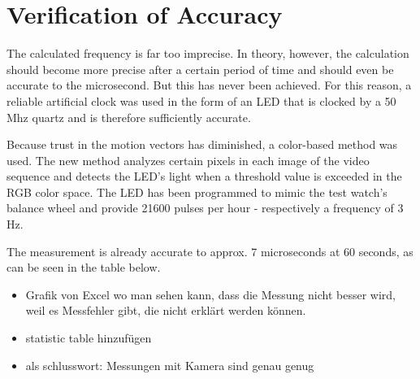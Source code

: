\documentclass[12pt, a4paper]{report}
\begin{document}
    \section{Verification of Accuracy}
    The calculated frequency is far too imprecise. In theory, however, the calculation should become more precise after a certain period of time and should even be accurate to the microsecond.
    But this has never been achieved. For this reason, a reliable artificial clock was used in the form of an LED that is clocked by a 50 Mhz quartz and is therefore sufficiently accurate.
    
    Because trust in the motion vectors has diminished, a color-based method was used. The new method analyzes certain pixels in each image of the video sequence and detects the LED's light when a threshold value is exceeded in the RGB color space.
    The LED has been programmed to mimic the test watch's balance wheel and provide 21600 pulses per hour -
    respectively a frequency of 3 Hz.

    The measurement is already accurate to approx. 7 microseconds at 60 seconds, as can be seen in the table below.

    \begin{itemize}
      \item Grafik von Excel wo man sehen kann, dass die Messung nicht besser wird, weil es Messfehler gibt, die nicht erklärt werden können.
      \item statistic table hinzufügen
    \item als schlusswort: Messungen mit Kamera sind genau genug
    \end{itemize}
   
\end{document}
